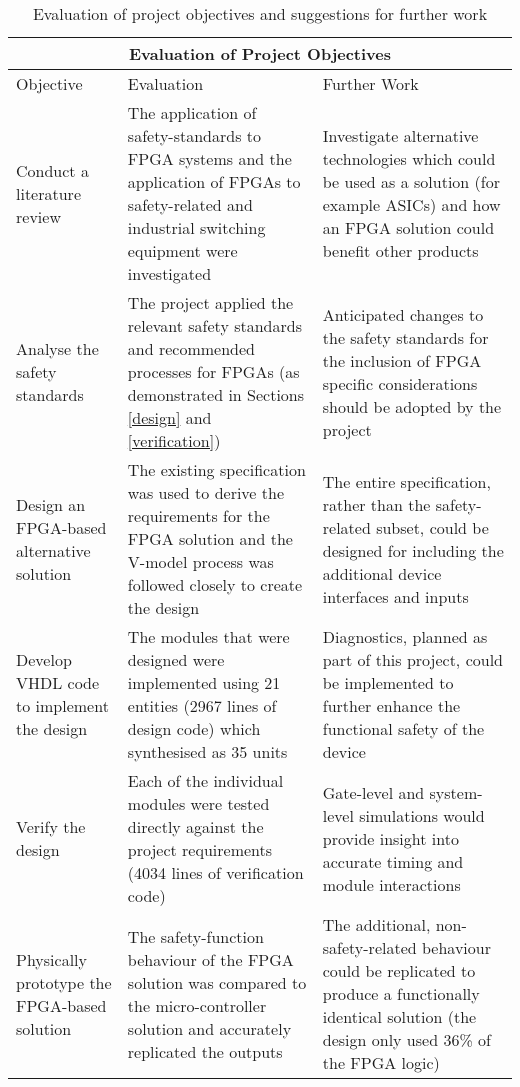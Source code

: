 \begin{table}[tH]
\centering
\begin{tabular}{ |p{}|p{}|p{}| }
 \hline
 \multicolumn{3}{|c|}{Evaluation of Project Objectives} \\
 \hline
 Objective & Evaluation & Further Work \\
 \hline
 \hline

 Conduct a literature review & The application of safety-standards to FPGA systems and the application of FPGAs to safety-related and industrial switching equipment were investigated & Investigate alternative technologies which could be used as a solution (for example ASICs) and how an FPGA solution could benefit other products \\
 \hline 
 Analyse the safety standards & The project applied the relevant safety standards and recommended processes  for FPGAs (as demonstrated in Sections \ref{design} and \ref{verification}) & Anticipated changes to the safety standards for the inclusion of FPGA specific considerations should be adopted by the project \\
 \hline 
 Design an FPGA-based alternative solution & The existing specification was used to derive the requirements for the FPGA solution and the V-model process was followed closely to create the design & The entire specification, rather than the safety-related subset, could be designed for including the additional device interfaces and inputs \\
 \hline
 Develop VHDL code to implement the design & The modules that were designed were implemented using 21 entities (2967 lines of design code) which synthesised as 35 units & Diagnostics, planned as part of this project, could be implemented to further enhance the functional safety of the device \\
 \hline
 Verify the design & Each of the individual modules were tested directly against the project requirements (4034 lines of verification code) & Gate-level and system-level simulations would provide insight into accurate timing and module interactions \\
 \hline
 Physically prototype the FPGA-based solution & The safety-function behaviour of the FPGA solution was compared to the micro-controller solution and accurately replicated the outputs & The additional, non-safety-related behaviour could be replicated to produce a functionally identical solution (the design only used 36\% of the FPGA logic) \\
 \hline 
\end{tabular}

\caption{Evaluation of project objectives and suggestions for further work}
\label{evaluation-table}
\end {table}